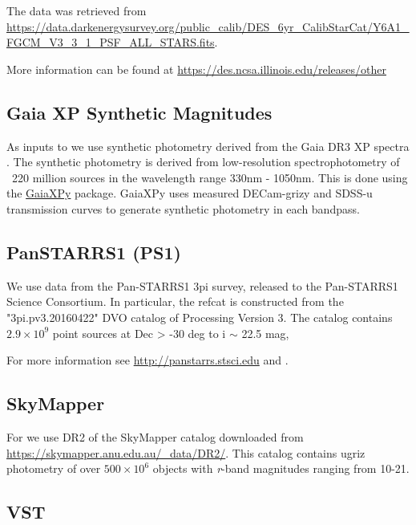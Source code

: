 The data was retrieved from \url{https://data.darkenergysurvey.org/public_calib/DES_6yr_CalibStarCat/Y6A1_FGCM_V3_3_1_PSF_ALL_STARS.fits}.

More information can be found at \url{https://des.ncsa.illinois.edu/releases/other}


\subsection{Gaia XP Synthetic Magnitudes}
\label{sec:gaiaxp}
As inputs to \monster we use synthetic photometry derived from the Gaia DR3 XP spectra \citep{GaiaCollaboration:2023}. 
The synthetic photometry is derived from low-resolution spectrophotometry of ~220 million sources in the wavelength range 330nm - 1050nm. 
This is done using the \href{https://github.com/gaia-dpci/GaiaXPy/cd}{GaiaXPy} package. 
GaiaXPy uses measured DECam-grizy and SDSS-u transmission curves to generate synthetic photometry in each bandpass. 


\subsection{PanSTARRS1 (PS1)}
\label{sec:ps1}

We use data from the Pan-STARRS1 3pi survey, released to the Pan-STARRS1 Science Consortium.
In particular, the refcat is constructed from the "3pi.pv3.20160422" DVO catalog of Processing Version 3.
The catalog contains $2.9 \times 10^9$ point sources at Dec > -30 deg to i $\sim$ 22.5 mag,

For more information see \url{http://panstarrs.stsci.edu} and \citet{Chambers:2016}.

\subsection{SkyMapper}
\label{sec:skymapper}
For \monster we use DR2 of the SkyMapper catalog \citep{Onken:2019} downloaded from \url{https://skymapper.anu.edu.au/_data/DR2/}. 
This catalog contains ugriz photometry of over $500 \times 10^6$ objects with \textit{r}-band magnitudes ranging from 10-21. 

\subsection{VST}
\label{sec:vst}

